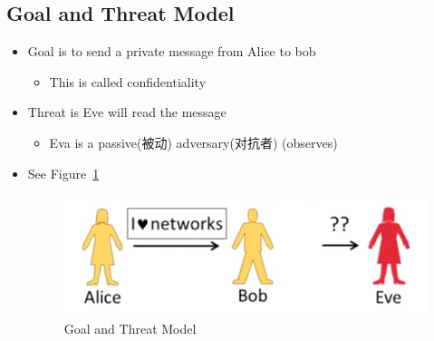 \documentclass[12pt]{ctexart}   %
\begin{document}
	\subsection{Goal and Threat Model}
	\begin{itemize}
		\item Goal is to send a private message from Alice to bob
		\begin{itemize}
			\item This is called confidentiality
		\end{itemize}

		\item Threat is Eve will read the message
		\begin{itemize}
			\item Eva is a passive(被动) adversary(对抗者) (observes)
		\end{itemize}
		\item See Figure~\ref{fig:10-2-2}
		  
		\begin{figure}[h!] %
		\centering
		\includegraphics[scale=0.7]{images/10-2-2}
		\caption{Goal and Threat Model}
		\label{fig:10-2-2}
		\end{figure}
	\end{itemize}
\end{document}
